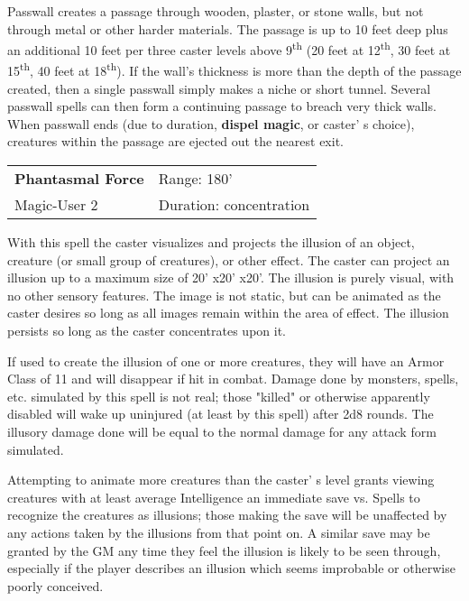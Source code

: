 \documentclass[a4paper,twoside,openany,10pt]{book}
\begin{document}
\begin{multicols}{2}
Passwall creates a passage through wooden, plaster, or stone walls, but not through metal or other harder materials. The passage is up to 10 feet deep plus an additional 10 feet per three caster levels above 9\textsuperscript{th} (20 feet at 12\textsuperscript{th}, 30 feet at 15\textsuperscript{th}, 40 feet at 18\textsuperscript{th}). If the wall's thickness is more than the depth of the passage created, then a single passwall simply makes a niche or short tunnel. Several passwall spells can then form a continuing passage to breach very thick walls. When passwall ends (due to duration, \textbf{dispel magic}, or caster' s choice), creatures within the passage are ejected out the nearest exit.

\smallskip\begin{flushleft} 
	\begin{tabularx}{0.45\textwidth}{@{}m{3.5cm}m{5.5cm}@{}} 
		\textbf{Phantasmal Force} & Range: 180'\\
Magic-User 2 &Duration: concentration\\
	\end{tabularx}\end{flushleft}

With this spell the caster visualizes and projects the illusion of an object, creature (or small group of creatures), or other effect. The caster can project an illusion up to a maximum size of 20' x20' x20'. The illusion is purely visual, with no other sensory features. The image is not static, but can be animated as the caster desires so long as all images remain within the area of effect. The illusion persists so long as the caster concentrates upon it.

If used to create the illusion of one or more creatures, they will have an Armor Class of 11 and will disappear if hit in combat. Damage done by monsters, spells, etc. simulated by this spell is not real; those "killed" or otherwise apparently disabled will wake up uninjured (at least by this spell) after 2d8 rounds. The illusory damage done will be equal to the normal damage for any attack form simulated.

Attempting to animate more creatures than the caster' s level grants viewing creatures with at least average Intelligence an immediate save vs. Spells to recognize the creatures as illusions; those making the save will be unaffected by any actions taken by the illusions from that point on. A similar save may be granted by the GM any time they feel the illusion is likely to be seen through, especially if the player describes an illusion which seems improbable or otherwise poorly conceived.


\end{multicols}
\end{document}
